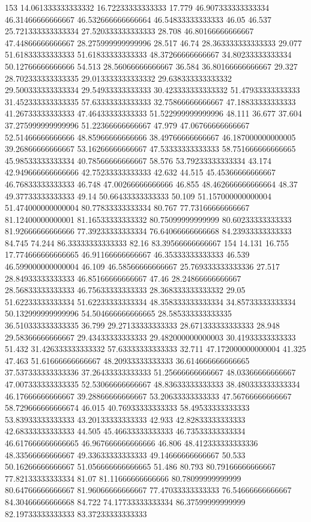 153 14.061333333333332 16.72233333333333 17.779 46.907333333333334 46.31466666666667 46.532666666666664 46.54833333333333 46.05 46.537 25.721333333333334 27.520333333333333 28.708 46.80166666666667 47.44866666666667 28.275999999999996 28.517 46.74 28.363333333333333 29.077 51.61833333333333 51.61833333333333 48.37266666666667 34.80233333333334 50.12766666666666 54.513 28.56066666666667 36.584 36.80166666666667 29.327 28.702333333333335 29.013333333333332 29.638333333333332 29.500333333333334 29.54933333333333 30.423333333333332 51.47933333333333 31.452333333333335 57.63333333333333 32.75866666666667 47.18833333333333 41.26733333333333 47.46433333333333 51.522999999999996 48.111 36.677 37.604 37.275999999999996 51.22366666666667 47.979 47.06766666666667 52.51466666666666 48.85966666666666 38.49766666666667 46.187000000000005 39.26866666666667 53.16266666666667 47.53333333333333 58.751666666666665 45.98533333333334 40.78566666666667 58.576 53.79233333333334 43.174 42.949666666666666 42.75233333333333 42.632 44.515 45.45366666666667 46.76833333333333 46.748 47.00266666666666 46.855 48.462666666666664 48.37 49.37733333333333 49.14 50.66433333333333 50.109 51.157000000000004 51.474000000000004 80.77833333333334 80.767 77.73166666666667 81.12400000000001 81.16533333333332 80.75099999999999 80.60233333333333 81.92666666666666 77.39233333333334 76.64066666666668 84.23933333333333 84.745 74.244 86.33333333333333 82.16 83.39566666666667
154 14.131 16.755 17.774666666666665 46.91166666666667 46.35333333333333 46.539 46.599000000000004 46.109 46.58566666666667 25.769333333333336 27.517 28.84933333333333 46.85166666666667 47.46 28.24866666666667 28.56833333333333 46.75633333333333 28.368333333333332 29.05 51.62233333333334 51.62233333333334 48.358333333333334 34.85733333333334 50.132999999999996 54.504666666666665 28.585333333333335 36.510333333333335 36.799 29.27133333333333 28.671333333333333 28.948 29.58366666666667 29.43433333333333 29.482000000000003 30.41933333333333 51.432 31.426333333333332 57.63333333333333 32.711 47.172000000000004 41.325 47.463 51.61666666666667 48.20933333333333 36.614666666666665 37.537333333333336 37.26433333333333 51.25666666666667 48.03366666666667 47.007333333333335 52.53066666666667 48.83633333333333 38.480333333333334 46.17666666666667 39.28866666666667 53.20633333333333 47.56766666666667 58.729666666666674 46.015 40.76933333333333 58.49533333333333 53.83933333333333 43.20133333333333 42.933 42.82833333333333 42.68333333333333 44.505 45.46633333333333 46.73533333333334 46.617666666666665 46.967666666666666 46.806 48.412333333333336 48.33566666666667 49.33633333333333 49.14666666666667 50.533 50.16266666666667 51.056666666666665 51.486 80.793 80.79166666666667 77.82133333333334 81.07 81.11666666666666 80.78099999999999 80.64766666666667 81.96066666666667 77.47033333333333 76.54666666666667 84.30466666666668 84.722 74.17733333333334 86.37599999999999 82.19733333333333 83.37233333333333
